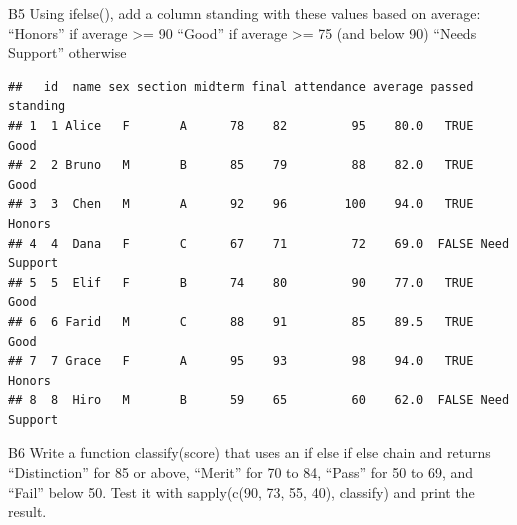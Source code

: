 \documentclass[
]{article}
\newenvironment{Shaded}{\begin{snugshade}}{\end{snugshade}}
\newcommand{\DecValTok}[1]{\textcolor[rgb]{0.00,0.00,0.81}{#1}}
\newcommand{\FunctionTok}[1]{\textcolor[rgb]{0.13,0.29,0.53}{\textbf{#1}}}
\newcommand{\NormalTok}[1]{#1}
\newcommand{\OtherTok}[1]{\textcolor[rgb]{0.56,0.35,0.01}{#1}}
\newcommand{\SpecialCharTok}[1]{\textcolor[rgb]{0.81,0.36,0.00}{\textbf{#1}}}
\newcommand{\StringTok}[1]{\textcolor[rgb]{0.31,0.60,0.02}{#1}}
\begin{document}
B5 Using ifelse(), add a column standing with these values based on
average: ``Honors'' if average \textgreater= 90 ``Good'' if average
\textgreater= 75 (and below 90) ``Needs Support'' otherwise

\begin{Shaded}
\end{Shaded}

\begin{verbatim}
##   id  name sex section midterm final attendance average passed     standing
## 1  1 Alice   F       A      78    82         95    80.0   TRUE         Good
## 2  2 Bruno   M       B      85    79         88    82.0   TRUE         Good
## 3  3  Chen   M       A      92    96        100    94.0   TRUE       Honors
## 4  4  Dana   F       C      67    71         72    69.0  FALSE Need Support
## 5  5  Elif   F       B      74    80         90    77.0   TRUE         Good
## 6  6 Farid   M       C      88    91         85    89.5   TRUE         Good
## 7  7 Grace   F       A      95    93         98    94.0   TRUE       Honors
## 8  8  Hiro   M       B      59    65         60    62.0  FALSE Need Support
\end{verbatim}

B6 Write a function classify(score) that uses an if else if else chain
and returns ``Distinction'' for 85 or above, ``Merit'' for 70 to 84,
``Pass'' for 50 to 69, and ``Fail'' below 50. Test it with sapply(c(90,
73, 55, 40), classify) and print the result.
\end{document}
